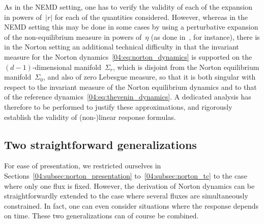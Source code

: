 As in the NEMD setting, one has to verify the validity of each of the expansion in powers of~$|r|$ for each of the quantities considered.
However, whereas in the NEMD setting this may be done in some cases by using a perturbative expansion of the non-equilibrium measure in powers of~$\eta$ (as done in~\cite{SS23}, for instance), there is in the Norton setting an additional technical difficulty in that the invariant measure for the Norton dynamics~\eqref{04:eq:norton_dynamics} is supported on the~$(d-1)$-dimensional manifold~$\Sigma_r$, which is disjoint from the Norton equilibrium manifold~$\Sigma_0$, and also of zero Lebesgue measure, so that it is both singular with respect to the invariant measure of the Norton equilibrium dynamics and to that of the reference dynamics~\eqref{04:eq:thevenin_dynamics}. A dedicated analysis has therefore to be performed to justify these approximations, and rigorously establish the validity of (non-)linear response formulas.

\subsection{Two straightforward generalizations}\label{04:subsec:norton_generalization}
    For ease of presentation, we restricted ourselves in Sections~\ref{04:subsec:norton_presentation} to~\ref{04:subsec:norton_tc} to the case where only one flux is fixed. However, the derivation of Norton dynamics can be straightforwardly extended to the case where several fluxes are simultaneously constrained. In fact, one can even consider situations where the response depends on time. These two generalizations can of course be combined.

